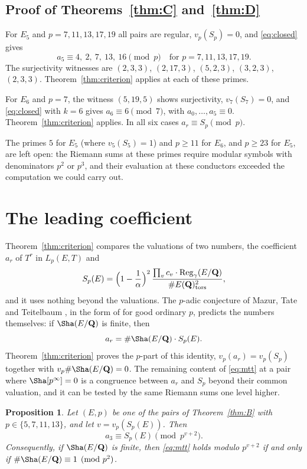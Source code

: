 \documentclass[11pt]{amsart}
\newtheorem{proposition}[theorem]{Proposition}
\theoremstyle{definition}
\newcommand{\Q}{\mathbf{Q}}
\newcommand{\Reg}{\mathrm{Reg}}
\newcommand{\tors}{\mathrm{tors}}
\begin{document}
\subsection{Proof of Theorems~\ref{thm:C} and~\ref{thm:D}}
For $E_5$ and $p=7,11,13,17,19$ all pairs are regular, $v_p(S_p)=0$, and \eqref{eq:closed} gives
\[
a_5\equiv4,\ 2,\ 7,\ 13,\ 16\pmod{p}\quad\text{for } p=7,11,13,17,19 .
\]
The surjectivity witnesses are $(2,3,3)$, $(2,17,3)$, $(5,2,3)$, $(3,2,3)$, $(2,3,3)$. Theorem~\ref{thm:criterion} applies at each of these primes.\RfivePfive

For $E_6$ and $p=7$, the witness $(5,19,5)$ shows surjectivity, $v_7(S_7)=0$, and \eqref{eq:closed} with $k=6$ gives $a_6\equiv6\pmod7$, with $a_0,\dots,a_5\equiv0$. Theorem~\ref{thm:criterion} applies. In all six cases $a_r\equiv S_p\pmod p$.

The primes $5$ for $E_5$ (where $v_5(S_5)=1$) and $p\ge11$ for $E_6$, and $p\ge23$ for $E_5$, are left open: the Riemann sums at these primes require modular symbols with denominators $p^2$ or $p^3$, and their evaluation at these conductors exceeded the computation we could carry out.

\section{The leading coefficient}\label{sec:leading}

Theorem~\ref{thm:criterion} compares the valuations of two numbers, the coefficient $a_r$ of $T^r$ in $L_p(E,T)$ and
\[
S_p(E)=\Bigl(1-\frac1\alpha\Bigr)^2\,\frac{\prod_vc_v\cdot\Reg_\gamma(E/\Q)}{\#E(\Q)_\tors^2},
\]
and it uses nothing beyond the valuations. The $p$-adic conjecture of Mazur, Tate and Teitelbaum \cite{MTT86}, in the form of \cite{SW13} for good ordinary $p$, predicts the numbers themselves: if $\Sha(E/\Q)$ is finite, then
\begin{equation}\label{eq:mtt}
a_r=\#\Sha(E/\Q)\cdot S_p(E).
\end{equation}
Theorem~\ref{thm:criterion} proves the $p$-part of this identity, $v_p(a_r)=v_p(S_p)$ together with $v_p\#\Sha(E/\Q)=0$. The remaining content of \eqref{eq:mtt} at a pair where $\Sha[p^\infty]=0$ is a congruence between $a_r$ and $S_p$ beyond their common valuation, and it can be tested by the same Riemann sums one level higher.

\begin{proposition}\label{prop:leading}
Let $(E,p)$ be one of the \NLpairs{} pairs of Theorem~\ref{thm:B} with $p\in\{5,7,11,13\}$, and let $v=v_p(S_p(E))$. Then
\[
a_3\equiv S_p(E)\pmod{p^{v+2}} .
\]
Consequently, if $\Sha(E/\Q)$ is finite, then \eqref{eq:mtt} holds modulo $p^{v+2}$ if and only if $\#\Sha(E/\Q)\equiv1\pmod{p^2}$.
\end{proposition}
\end{document}
